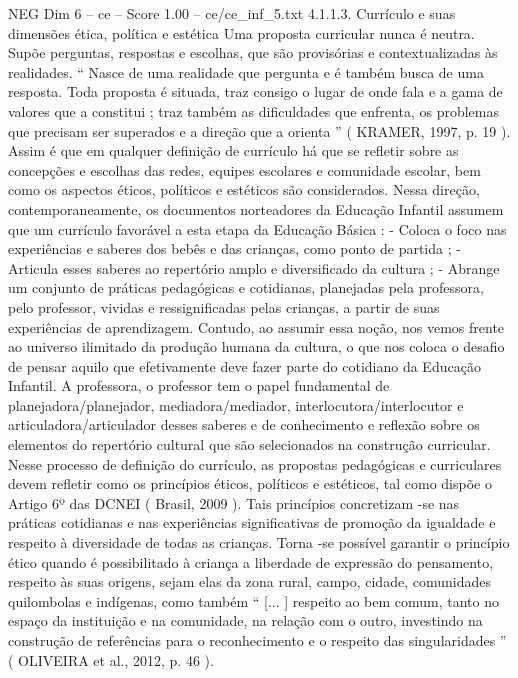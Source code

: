 \begin{textsample}{NEG Dim 6 – ce – Score 1.00 – ce/ce\_inf\_5.txt}  \label{ex:f6_neg_255}
4.1.1.3.
Currículo e suas dimensões ética, política e estética Uma proposta curricular nunca é neutra.
Supõe perguntas, respostas e escolhas, que são provisórias e contextualizadas às realidades. “ Nasce de uma realidade que pergunta e é também busca de uma resposta.
Toda proposta é situada, traz consigo o lugar de onde fala e a gama de valores que a constitui ; traz também as dificuldades que enfrenta, os problemas que precisam ser superados e a direção que a orienta ” ( KRAMER, 1997, p. 19 ).
Assim é que em qualquer definição de currículo há que se refletir sobre as concepções e escolhas das redes, equipes escolares e comunidade escolar, bem como os aspectos éticos, políticos e estéticos são considerados.
Nessa direção, contemporaneamente, os documentos norteadores da Educação Infantil assumem que um currículo favorável a esta etapa da Educação Básica : - Coloca o foco nas experiências e saberes dos bebês e das crianças, como ponto de partida ; - Articula esses saberes ao repertório amplo e diversificado da cultura ; - Abrange um conjunto de práticas pedagógicas e cotidianas, planejadas pela professora, pelo professor, vividas e ressignificadas pelas crianças, a partir de suas experiências de aprendizagem.
Contudo, ao assumir essa noção, nos vemos frente ao universo ilimitado da produção humana da cultura, o que nos coloca o desafio de pensar aquilo que efetivamente deve fazer parte do cotidiano da Educação Infantil.
A professora, o professor tem o papel fundamental de planejadora/planejador, mediadora/mediador, interlocutora/interlocutor e articuladora/articulador desses saberes e de conhecimento e reflexão sobre os elementos do repertório cultural que são selecionados na construção curricular.
Nesse processo de definição do currículo, as propostas pedagógicas e curriculares devem refletir como os princípios éticos, políticos e estéticos, tal como dispõe o Artigo 6º das DCNEI ( Brasil, 2009 ).
Tais princípios concretizam -se nas práticas cotidianas e nas experiências significativas de promoção da igualdade e respeito à diversidade de todas as crianças.
Torna -se possível garantir o princípio ético quando é possibilitado à criança a liberdade de expressão do pensamento, respeito às suas origens, sejam elas da zona rural, campo, cidade, comunidades quilombolas e indígenas, como também “ [... ] respeito ao bem comum, tanto no espaço da instituição e na comunidade, na relação com o outro, investindo na construção de referências para o reconhecimento e o respeito das singularidades ” ( OLIVEIRA et al., 2012, p. 46 ).

\end{textsample}
